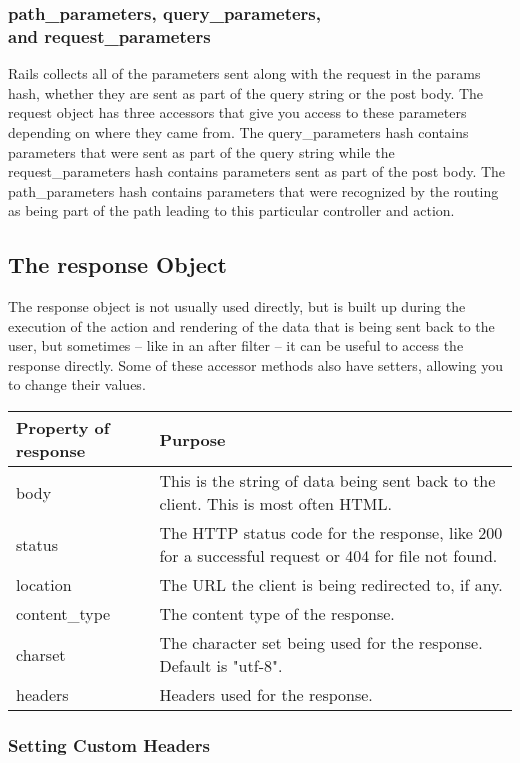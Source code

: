 \documentclass[10pt]{book}
\begin{document}
\subsubsection{ path\_parameters, query\_parameters, \\ and request\_parameters}

Rails collects all of the parameters sent along with the request in the params  hash, whether they are sent as part of the query string or the post  body. The request object has three accessors that give you access to  these parameters depending on where they came from. The query\_parameters hash contains parameters that were sent as part of the query string while the request\_parameters hash contains parameters sent as part of the post body. The path\_parameters  hash contains parameters that were recognized by the routing as being  part of the path leading to this particular controller and action.

\subsection{ The response Object}

The response object is not usually used directly, but is built up  during the execution of the action and rendering of the data that is  being sent back to the user, but sometimes – like in an after filter –  it can be useful to access the response directly. Some of these accessor  methods also have setters, allowing you to change their values.
\\

\noindent
\begin{tabular}{l|p{}}
\hline
\textbf{Property of response} & \textbf{Purpose} \\ 
\hline
body & This is the string of data being sent back to the client. This is most often HTML. \\ 
status & The HTTP status code for the response, like 200 for a successful request or 404 for file not found. \\ 
location & The URL the client is being redirected to, if any. \\ 
content\_type & The content type of the response. \\ 
charset & The character set being used for the response. Default is "utf-8". \\ 
headers & Headers used for the response.
\end{tabular}

\subsubsection{ Setting Custom Headers}
\end{document}
